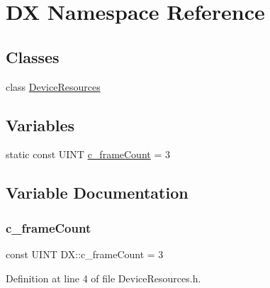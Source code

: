 \hypertarget{namespace_d_x}{}\section{DX Namespace Reference}
\label{namespace_d_x}
\subsection*{Classes}
\begin{DoxyCompactItemize}
\item 
class \mbox{\hyperlink{class_d_x_1_1_device_resources}{Device\+Resources}}
\end{DoxyCompactItemize}
\subsection*{Variables}
\begin{DoxyCompactItemize}
\item 
static const U\+I\+NT \mbox{\hyperlink{namespace_d_x_a13eecb6f150dc97fc5c7c8597377d0fb}{c\+\_\+frame\+Count}} = 3
\end{DoxyCompactItemize}


\subsection{Variable Documentation}
\mbox{\label{namespace_d_x_a13eecb6f150dc97fc5c7c8597377d0fb}} 
\subsubsection{\texorpdfstring{c\+\_\+frame\+Count}{c\_frameCount}}
{\footnotesize\ttfamily const U\+I\+NT D\+X\+::c\+\_\+frame\+Count = 3\hspace{0.3cm}{\ttfamily [static]}}



Definition at line 4 of file Device\+Resources.\+h.

